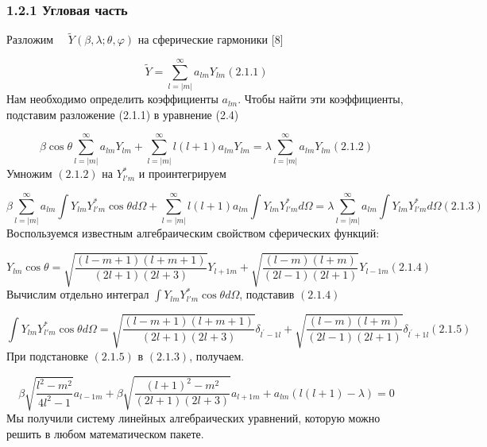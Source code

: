 \subsubsection[1.2.1 Угловая часть]{1.2.1
Угловая часть}
Разложим \ \  $\widetilde
Y(\beta ,\lambda ;\theta ,\varphi )$ на
сферические гармоники [8]

\begin{equation*}
\widetilde Y=\sum _{l=|m|}^{{\infty}}a_{\mathit{lm}}Y_{\mathit{lm}}(2.1.1)
\end{equation*}
Нам необходимо определить
коэффициенты  $a_{\mathit{lm}}$.
Чтобы найти эти коэффициенты, подставим разложение (2.1.1) в уравнение (2.4)

\begin{equation*}
\beta \cos \theta \sum _{l=|m|}^{{\infty}}a_{\mathit{lm}}Y_{\mathit{lm}}+\sum _{l=| m|
}^{{\infty}}l(l+1)a_{\mathit{lm}}Y_{\mathit{lm}}=\lambda \sum _{l=| m|
}^{{\infty}}a_{\mathit{lm}}Y_{\mathit{lm}}(2.1.2)
\end{equation*}
Умножим  $(2.1.2)$ на  $Y_{l'm}^{\ast }$ и
проинтегрируем

\begin{equation*}
\beta \sum _{l=| m| }^{{\infty}}a_{\mathit{lm}}\int Y_{\mathit{lm}}Y_{l'm}^{\ast }\cos \theta \mathit{d\Omega
}+\sum _{l=| m| }^{{\infty}}l(l+1)a_{\mathit{lm}}\int Y_{\mathit{lm}}Y_{l'm}^{\ast }\mathit{d\Omega }=\lambda
\sum _{l=| m| }^{{\infty}}a_{\mathit{lm}}\int Y_{\mathit{lm}}Y_{l'm}^{\ast }\mathit{d\Omega }(2.1.3)
\end{equation*}
Воспользуемся известным алгебраическим свойством сферических функций:

\begin{equation*}
Y_{\mathit{lm}}\cos \theta
=\sqrt{\frac{(l-m+1)(l+m+1)}{\left(2l+1\right)(2l+3)}}Y_{l+1m}+\sqrt{\frac{(l-m)(l+m)}{\left(2l-1\right)(2l+1)}}Y_{l-1m}(2.1.4)
\end{equation*}
Вычислим отдельно
интеграл  $\int Y_{\mathit{lm}}Y_{l'm}^{\ast }\cos \theta
\mathit{d\Omega }$, подставив  $(2.1.4)$

\begin{equation*}
\int Y_{\mathit{lm}}Y_{l'm}^{\ast }\cos \theta \mathit{d\Omega
}=\sqrt{\frac{(l-m+1)(l+m+1)}{\left(2l+1\right)(2l+3)}}\delta
_{l^{'}-1l}+\sqrt{\frac{(l-m)(l+m)}{\left(2l-1\right)(2l+1)}}\delta _{l^{'}+1l}(2.1.5)
\end{equation*}
При подстановке  $(2.1.5)$ в
$(2.1.3)$, получаем.

\begin{equation*}
\beta \sqrt{\frac{l^2-m^2}{4l^2-1}}a_{l-1m}+\beta
\sqrt{\frac{\left(l+1\right)^2-m^2}{\left(2l+1\right)(2l+3)}}a_{l+1m}+a_{\mathit{lm}}\left(l\left(l+1\right)-\lambda
\right)=0
\end{equation*}
Мы получили систему линейных алгебраических уравнений, которую можно решить в любом математическом пакете.

